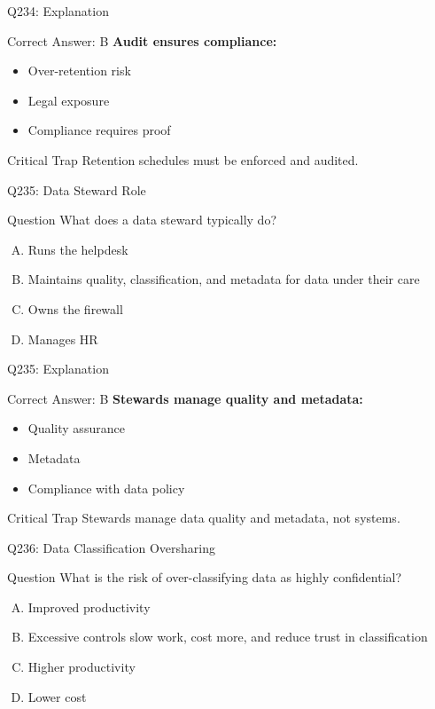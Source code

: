 \documentclass{beamer}
\begin{document}
	\begin{frame}{Q234: Explanation}
		\begin{block}{Correct Answer: B}
			\textbf{Audit ensures compliance:}
			\begin{itemize}
				\item Over-retention risk
				\item Legal exposure
				\item Compliance requires proof
			\end{itemize}
		\end{block}
		\begin{alertblock}{Critical Trap}
			Retention schedules must be enforced and audited.
		\end{alertblock}
	\end{frame}
	
	\begin{frame}{Q235: Data Steward Role}
		\begin{block}{Question}
			What does a data steward typically do?
		\end{block}
		\begin{enumerate}[(A)]
			\item Runs the helpdesk
			\item Maintains quality, classification, and metadata for data under their care
			\item Owns the firewall
			\item Manages HR
		\end{enumerate}
	\end{frame}
	
	\begin{frame}{Q235: Explanation}
		\begin{block}{Correct Answer: B}
			\textbf{Stewards manage quality and metadata:}
			\begin{itemize}
				\item Quality assurance
				\item Metadata
				\item Compliance with data policy
			\end{itemize}
		\end{block}
		\begin{alertblock}{Critical Trap}
			Stewards manage data quality and metadata, not systems.
		\end{alertblock}
	\end{frame}
	
	\begin{frame}{Q236: Data Classification Oversharing}
		\begin{block}{Question}
			What is the risk of over-classifying data as highly confidential?
		\end{block}
		\begin{enumerate}[(A)]
			\item Improved productivity
			\item Excessive controls slow work, cost more, and reduce trust in classification
			\item Higher productivity
			\item Lower cost
		\end{enumerate}
	\end{frame}
	
\end{document}

